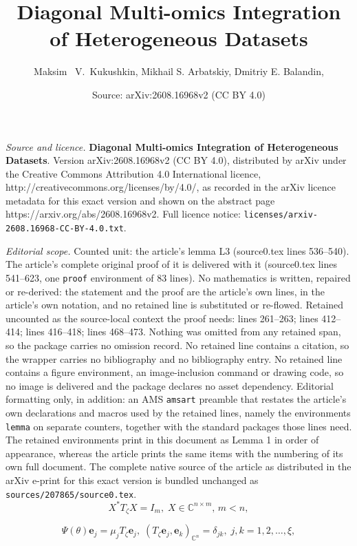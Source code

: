 \documentclass[10pt,a4paper]{amsart}
\title{{\bf Diagonal Multi-omics Integration of Heterogeneous Datasets}}
\author{Maksim \, V.~Kukushkin, Mikhail S. Arbatskiy, Dmitriy E. Balandin, }
\date{Source: arXiv:2608.16968v2 (CC BY 4.0)}
\begin{document}
\maketitle

\noindent\emph{Source and licence.} {\bf Diagonal Multi-omics Integration of Heterogeneous Datasets}. Version arXiv:2608.16968v2 (CC BY 4.0), distributed by arXiv under the Creative Commons Attribution 4.0 International licence, http://creativecommons.org/licenses/by/4.0/, as recorded in the arXiv licence metadata for this exact version and shown on the abstract page https://arxiv.org/abs/2608.16968v2. Full licence notice: \texttt{licenses/arxiv-2608.16968-CC-BY-4.0.txt}.\par\smallskip

\noindent\textit{Editorial scope.} Counted unit: the article's lemma L3 (source0.tex lines 536--540). The article's complete original proof of it is delivered with it (source0.tex lines 541--623, one \texttt{proof} environment of 83 lines). No mathematics is written, repaired or re-derived: the statement and the proof are the article's own lines, in the article's own notation, and no retained line is substituted or re-flowed.  Retained uncounted as the source-local context the proof needs: lines 261--263; lines 412--414; lines 416--418; lines 468--473.  Nothing was omitted from any retained span, so the package carries no omission record.  No retained line contains a citation, so the wrapper carries no bibliography and no bibliography entry.  No retained line contains a figure environment, an image-inclusion command or drawing code, so no image is delivered and the package declares no asset dependency.  Editorial formatting only, in addition: an AMS \texttt{amsart} preamble that restates the article's own declarations and macros used by the retained lines, namely the environments \texttt{lemma} on separate counters, together with the standard packages those lines need.  The retained environments print in this document as Lemma 1 in order of appearance, whereas the article prints the same items with the numbering of its own full document.  The complete native source of the article as distributed in the arXiv e-print for this exact version is bundled unchanged as \texttt{sources/207865/source0.tex}.
\begin{equation}\label{2}
X^{\ast}T_{\zeta}X= I_{m},\;X\in \mathbb{C}^{n\times m},\,m<n,
\end{equation}

\begin{equation}\label{7}
\Psi(\theta)\mathbf{e}_{ j } =\mu_{j} T_{\zeta}\mathbf{e}_{ j },\;(T_{\zeta}\mathbf{e} _{ j },\mathbf{e} _{ k })_{\mathbb{C}^{n}}=\delta_{jk},\;j,k=1,2,\dots,\xi,
\end{equation}
\end{document}
